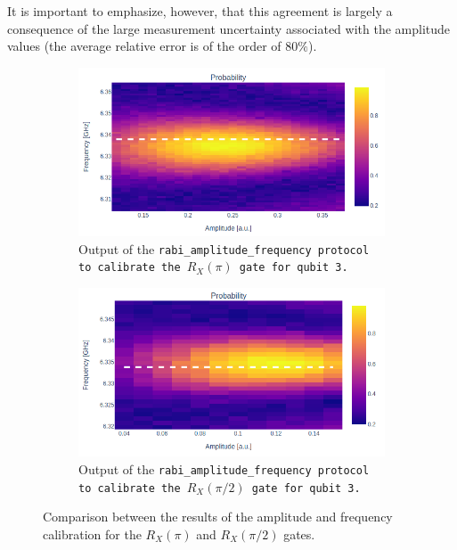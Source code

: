 It is important to emphasize, however, that this agreement is largely a consequence of the large measurement uncertainty associated with the amplitude values (the average relative error is of the order of $80\%$).

\begin{figure}[h!]
    \centering
    \begin{subfigure}[t]{0.495\textwidth}
        \includegraphics[width=\textwidth]{figures/png/RX90/RabiAmplitudeFrequency/RX.png}
        \caption{Output of the \tt{rabi\_amplitude\_frequency} protocol to calibrate the $R_X(\pi)$ gate for qubit \tt{3}.}
        \label{fig:RX_3}
    \end{subfigure}
    \hfill
    \begin{subfigure}[t]{0.495\textwidth}
        \includegraphics[width=\textwidth]{figures/png/RX90/RabiAmplitudeFrequency/RX90.png}
        \caption{Output of the \tt{rabi\_amplitude\_frequency} protocol to calibrate the $R_X(\pi/2)$ gate for qubit \tt{3}.}
        \label{fig:RX90_30}
    \end{subfigure}
    \caption{Comparison between the results of the amplitude and frequency calibration for the $R_X(\pi)$ and $R_X(\pi/2)$ gates.}
    \label{fig:af_qw5q}
\end{figure}

